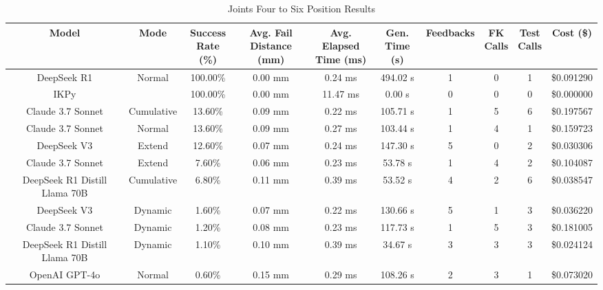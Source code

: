 \begin{table}[H]
\tiny
\renewcommand{\arraystretch}{1.2}
\caption{Joints Four to Six Position Results}
\begin{center}
\begin{tabular}{|c|c|c|c|c|c|c|c|c|c|}
    \hline
    \textbf{Model} & 
    \textbf{Mode} & 
    \makecell{\textbf{Success}\\\textbf{Rate (\%)}} &
    \makecell{\textbf{Avg. Fail}\\\textbf{Distance (mm)}} &
    \makecell{\textbf{Avg. Elapsed}\\\textbf{Time (ms)}} &
    \makecell{\textbf{Gen.}\\\textbf{Time (s)}} &
    \textbf{Feedbacks} &
    \makecell{\textbf{FK}\\\textbf{Calls}} &
    \makecell{\textbf{Test}\\\textbf{Calls}} &
    \textbf{Cost (\$)} \\
    \hline
    DeepSeek R1 & Normal & 100.00\% & 0.00 mm & 0.24 ms & 494.02 s & 1 & 0 & 1 & \$0.091290 \\
    \hline
    IKPy &  & 100.00\% & 0.00 mm & 11.47 ms & 0.00 s & 0 & 0 & 0 & \$0.000000 \\
    \hline
    Claude 3.7 Sonnet & Cumulative & 13.60\% & 0.09 mm & 0.22 ms & 105.71 s & 1 & 5 & 6 & \$0.197567 \\
    \hline
    Claude 3.7 Sonnet & Normal & 13.60\% & 0.09 mm & 0.27 ms & 103.44 s & 1 & 4 & 1 & \$0.159723 \\
    \hline
    DeepSeek V3 & Extend & 12.60\% & 0.07 mm & 0.24 ms & 147.30 s & 5 & 0 & 2 & \$0.030306 \\
    \hline
    Claude 3.7 Sonnet & Extend & 7.60\% & 0.06 mm & 0.23 ms & 53.78 s & 1 & 4 & 2 & \$0.104087 \\
    \hline
    DeepSeek R1 Distill Llama 70B & Cumulative & 6.80\% & 0.11 mm & 0.39 ms & 53.52 s & 4 & 2 & 6 & \$0.038547 \\
    \hline
    DeepSeek V3 & Dynamic & 1.60\% & 0.07 mm & 0.22 ms & 130.66 s & 5 & 1 & 3 & \$0.036220 \\
    \hline
    Claude 3.7 Sonnet & Dynamic & 1.20\% & 0.08 mm & 0.23 ms & 117.73 s & 1 & 5 & 3 & \$0.181005 \\
    \hline
    DeepSeek R1 Distill Llama 70B & Dynamic & 1.10\% & 0.10 mm & 0.39 ms & 34.67 s & 3 & 3 & 3 & \$0.024124 \\
    \hline
    OpenAI GPT-4o & Normal & 0.60\% & 0.15 mm & 0.29 ms & 108.26 s & 2 & 3 & 1 & \$0.073020 \\

\end{tabular}
\end{center}
\end{table}
